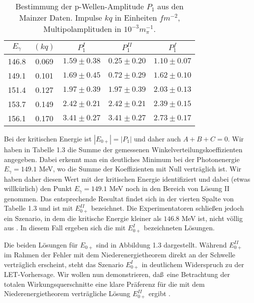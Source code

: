 \begin{table}
\label{p1tab}
\caption{Bestimmung der p-Wellen-Amplitude $P_1$ aus den Mainzer Daten. Impulse 
$kq$ in Einheiten $fm^{-2}$, Multipolamplituden in $10^{-3} m_\pi^{-1}$.}
\begin{center}
\begin{tabular}{|c||c|c|c|c|} \hline
$E_{\gamma}$ & $(kq)$ & $P_1^I$        & $P_1^{II}$      & $P_1^f$    \\ \hline
                                                                         \hline
 146.8  & 0.069     & $1.59\pm 0.38$   & $0.25\pm 0.20$  & $1.10\pm 0.07$ \\
 149.1  & 0.101     & $1.69\pm 0.45$   & $0.72\pm 0.29$  & $1.62\pm 0.10$ \\  
 151.4  & 0.127     & $1.97\pm 0.39$   & $1.97\pm 0.39$  & $2.03\pm 0.13$ \\
 153.7  & 0.149     & $2.42\pm 0.21$   & $2.42\pm 0.21$  & $2.39\pm 0.15$ \\
 156.1  & 0.170     & $3.41\pm 0.27$   & $3.41\pm 0.27$  & $2.73\pm 0.17$ \\
 \hline
\end{tabular}
\end{center}
\end{table}
 

Bei der kritischen Energie ist $|E_{0+}|=|P_1|$ und daher auch
$A+B+C=0$. Wir haben in Tabelle 1.3 die Summe der gemessenen 
Winkelverteilungskoeffizienten angegeben. Dabei erkennt man ein deutliches
Minimum bei der Photonenergie $E_\gamma=149.1$ MeV, wo die Summe der
Koeffizienten mit Null vertr\"aglich ist. Wir haben daher diesen Wert
mit der kritischen Energie identifiziert und dabei (etwas willk\"urlich)
den Punkt $E_\gamma=149.1$ MeV noch in den Bereich von L\"osung II genommen.
Das entsprechende Resultat findet sich in der vierten Spalte von Tabelle
1.3 und ist mit $E_{0+}^{II}$ bezeichnet. Die Experimentatoren
schlie\ss en jedoch ein Szenario, in dem die kritische Energie kleiner 
als $146.8$ MeV ist, nicht v\"ollig aus \cite{Bec90}.
In diesem Fall ergeben sich die mit $E_{0+}^{I}$ bezeichneten
L\"osungen. 

Die beiden L\"osungen f\"ur $E_{0+}$ sind in Abbildung 1.3 dargestellt.
W\"ahrend $E_{0+}^{II}$ im Rahmen der Fehler mit dem Niederenergietheorem
direkt an der Schwelle vertr\"aglich erscheint, steht das Szenario $E_{0+}^I$
in deutlichem Widerspruch zu der LET-Vorhersage. Wir wollen nun 
demonstrieren, da\ss\ eine Betrachtung der totalen Wirkungsquerschnitte 
eine klare Pr\"aferenz f\"ur die mit dem Niederenergietheorem
vertr\"agliche L\"osung $E_{0+}^{II}$ ergibt \cite{Ber91,Sch91}.


